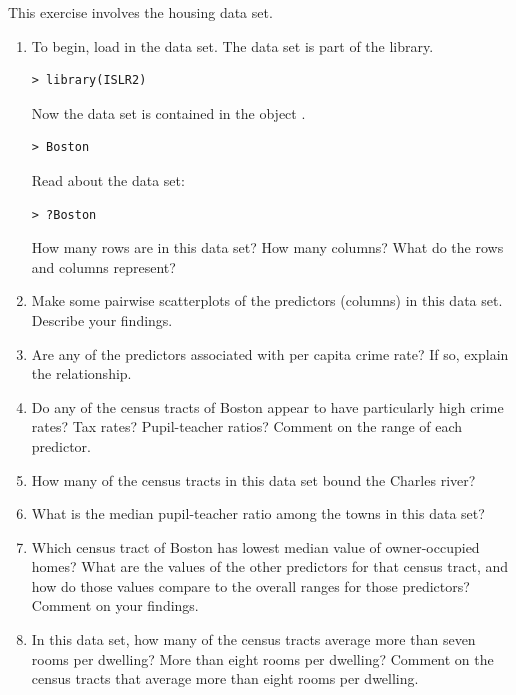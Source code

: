 \documentclass[12pt]{report}
\begin{document}
\begin{exercise}
This exercise involves the  housing data set.
\begin{enumerate}
    \item[(a)] To begin, load in the  data set. The  data set is part of the  library.
\begin{lstlisting}
> library(ISLR2)
\end{lstlisting}
    Now the data set is contained in the object .
\begin{lstlisting}
> Boston
\end{lstlisting}
    Read about the data set:
\begin{lstlisting}
> ?Boston
\end{lstlisting}
    How many rows are in this data set? How many columns? What do the rows and columns represent?
    
    \item[(b)] Make some pairwise scatterplots of the predictors (columns) in this data set. Describe your findings.
    
    \item[(c)] Are any of the predictors associated with per capita crime rate? If so, explain the relationship.
    
    \item[(d)] Do any of the census tracts of Boston appear to have particularly high crime rates? Tax rates? Pupil-teacher ratios? Comment on the range of each predictor.
    
    \item[(e)] How many of the census tracts in this data set bound the Charles river?
    
    \item[(f)] What is the median pupil-teacher ratio among the towns in this data set?
    
    \item[(g)] Which census tract of Boston has lowest median value of owner-occupied homes? What are the values of the other predictors for that census tract, and how do those values compare to the overall ranges for those predictors? Comment on your findings.
    
    \item[(h)] In this data set, how many of the census tracts average more than seven rooms per dwelling? More than eight rooms per dwelling? Comment on the census tracts that average more than eight rooms per dwelling.
\end{enumerate}
\end{exercise}
\end{document}
